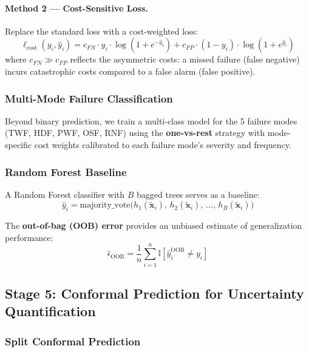 \documentclass[12pt, a4paper]{article}
\begin{document}
\paragraph{Method 2 --- Cost-Sensitive Loss.} Replace the standard loss with a cost-weighted loss:
\begin{equation}\label{eq:cost-loss}
    \ell_{\mathrm{cost}}(y_i, \hat{y}_i) = c_{FN}\cdot y_i\cdot\log(1 + e^{-\hat{y}_i}) + c_{FP}\cdot(1-y_i)\cdot\log(1 + e^{\hat{y}_i})
\end{equation}
where $c_{FN} \gg c_{FP}$ reflects the asymmetric costs: a missed failure (false negative) incurs catastrophic costs compared to a false alarm (false positive).

\subsubsection{Multi-Mode Failure Classification}

Beyond binary prediction, we train a multi-class model for the 5 failure modes (TWF, HDF, PWF, OSF, RNF) using the \textbf{one-vs-rest} strategy with mode-specific cost weights calibrated to each failure mode's severity and frequency.

\subsubsection{Random Forest Baseline}

A Random Forest classifier with $B$ bagged trees serves as a baseline:
\begin{equation}
    \hat{y}_i = \mathrm{majority\_vote}\!\bigl(h_1(\tilde{\mathbf{x}}_i),\, h_2(\tilde{\mathbf{x}}_i),\, \ldots,\, h_B(\tilde{\mathbf{x}}_i)\bigr)
\end{equation}

The \textbf{out-of-bag (OOB) error} provides an unbiased estimate of generalization performance:
\begin{equation}
    \hat{\epsilon}_{\mathrm{OOB}} = \frac{1}{n}\sum_{i=1}^{n}\mathbb{I}\!\left[\hat{y}_i^{\mathrm{OOB}} \neq y_i\right]
\end{equation}

\subsection{Stage 5: Conformal Prediction for Uncertainty Quantification}

\subsubsection{Split Conformal Prediction}
\end{document}
